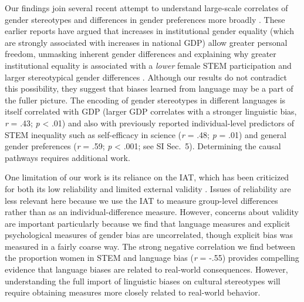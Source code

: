\documentclass[9pt,twocolumn,twoside]{pnas-new}
\begin{document}
Our findings join several recent attempt to understand large-scale correlates of gender stereotypes 
\cite{stoet2018gender} and differences in gender preferences more broadly \cite{falk2018relationship}. These earlier reports have argued that increases in institutional gender equality (which are strongly associated with increases in national GDP) allow greater personal freedom, unmasking inherent gender differences and explaining why greater institutional equality is associated with a \textit{lower} female STEM participation \cite{stoet2018gender} and larger stereotypical gender differences \citep[e.g., women being more risk averse and less patient than men;][]{falk2018relationship}. Although our results do not contradict this possibility, they suggest that biases learned from language may be a part of the fuller picture. The encoding of gender stereotypes in different languages is itself correlated with GDP (larger GDP correlates with a stronger linguistic bias, \emph{r} = .43; \emph{p} \textless{} .01) and also with previously reported individual-level predictors of STEM inequality such as self-efficacy in science  (\emph{r} = .48; \emph{p} = .01) and general gender preferences (\emph{r} = .59; \emph{p} < .001; see SI Sec.\ 5). Determining the causal pathways requires additional work. 

One limitation of our work is its reliance on the IAT, which has been criticized for both its low reliability \cite{lane2007understanding} and limited external validity \cite{fazio2003implicit}. Issues of reliability are less relevant here because we use the IAT to measure group-level differences rather than as an individual-difference measure. However, concerns about validity are important particularly because we find that language measures and explicit psychological measures of gender bias are uncorrelated, though explicit bias was measured in a fairly coarse way. The strong negative correlation we find between the proportion women in STEM and language bias (\emph{r} = -.55) provides compelling evidence that language biases are related to real-world consequences. However, understanding the full import of linguistic biases on cultural stereotypes will require obtaining measures more closely related to real-world behavior. 
\end{document}
